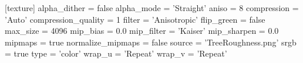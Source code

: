 [texture]
alpha_dither = false
alpha_mode = 'Straight'
aniso = 8
compression = 'Auto'
compression_quality = 1
filter = 'Anisotropic'
flip_green = false
max_size = 4096
mip_bias = 0.0
mip_filter = 'Kaiser'
mip_sharpen = 0.0
mipmaps = true
normalize_mipmaps = false
source = 'TreeRoughness.png'
srgb = true
type = 'color'
wrap_u = 'Repeat'
wrap_v = 'Repeat'